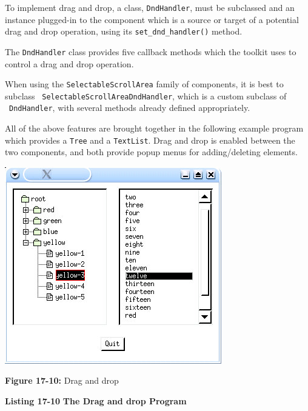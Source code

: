 To implement drag and drop, a class, \texttt{DndHandler}, must be
subclassed and an instance {\textquotedbl}plugged-in{\textquotedbl} to
the component which is a source or target of a potential drag and drop
operation, using its \texttt{set\_dnd\_handler()} method.

The \texttt{DndHandler} class provides five callback methods which the
toolkit uses to control a drag and drop operation.

When using the \texttt{SelectableScrollArea} family of components, it is
best to subclass \ \texttt{SelectableScrollAreaDndHandler}, which is a
custom subclass of \ \texttt{DndHandler}, with several methods already
defined appropriately.

All of the above features are brought together in the following example
program which provides a \texttt{Tree} and a \texttt{TextList}. Drag
and drop is enabled between the two components, and both provide popup
menus for adding/deleting elements.

\bigskip

\bigskip

\begin{center}
\includegraphics[width=3.7189in,height=3.3846in]{ub-img/ub-img59.jpg}
\end{center}

{\sffamily\bfseries Figure 17-10:}
{\sffamily Drag and drop}

\bigskip

{\sffamily\bfseries Listing 17-10}
{\sffamily\bfseries The Drag and drop Program}

